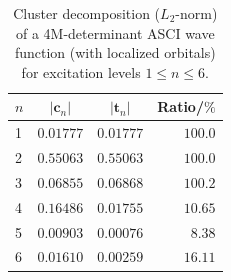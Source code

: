 \documentclass[journal=jcp,manuscript=suppinfo]{achemso}
\begin{document}
\begin{table}[ht!]
	\begin{center}
		\caption{Cluster decomposition ($L_2$-norm) of a 4M-determinant ASCI wave function (with localized orbitals) for excitation levels $1 \leq n \leq 6$.}
		\label{cluster_decomp_SI_table2}
		\begin{tabular}{l|r|r|r}
			\toprule
			\multicolumn{1}{c|}{$n$} & \multicolumn{1}{c|}{$|\bm{c}_n|$} & \multicolumn{1}{c|}{$|\bm{t}_n|$} & \multicolumn{1}{c}{Ratio/$\%$} \\
			\midrule\midrule
			1&	$0.01777$ &	$0.01777$&	$100.0$\\
			2&	$0.55063$ &	$0.55063$&	$100.0$\\
			3&	$0.06855$ &	$0.06868$&	$100.2$\\
			4&	$0.16486$ &	$0.01755$&	$10.65$\\
			5&	$0.00903$ &	$0.00076$&	$8.38$\\
			6&	$0.01610$ &	$0.00259$&	$16.11$\\
			\midrule
		\end{tabular}
		\vspace{-0.6cm}
	\end{center}
\end{table}


\newpage



%
\end{document}
